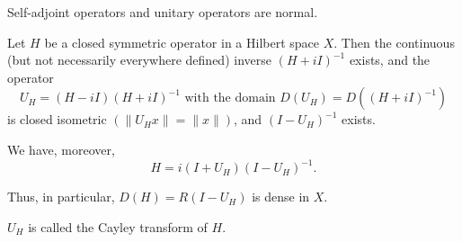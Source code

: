 Self-adjoint operators and unitary operators are normal. 


\begin{theorem}\label{thm:VII.4.Theorem.1} Let $H$ be a closed symmetric operator in a Hilbert space $X$. Then the continuous (but not necessarily everywhere defined) inverse $(H + iI)^{-1}$ exists, and the operator 
\begin{equation}\label{eq:VII.4.4}
U _{H} = (H - iI) (H + iI) ^{-1} \text{ with the domain } D(U_{H}) = D((H + iI) ^{-1})
\end{equation}
is closed isometric $(\|U_H x\| = \|x\|)$, and $(I - U_H)^{-1}$ exists. 
\end{theorem}


We have, moreover, 
\begin{equation}\label{eq:VII.4.5}
H = i (I + U _{H}) (I - U _{H}) ^{-1}.
\end{equation}

Thus, in particular, $D(H) = R(I - U_H)$ is dense in $X$. 

\begin{definition}\label{def:VII.4.Definition.3} $U_{H}$ is called the Cayley transform of $H$. 
\end{definition}

